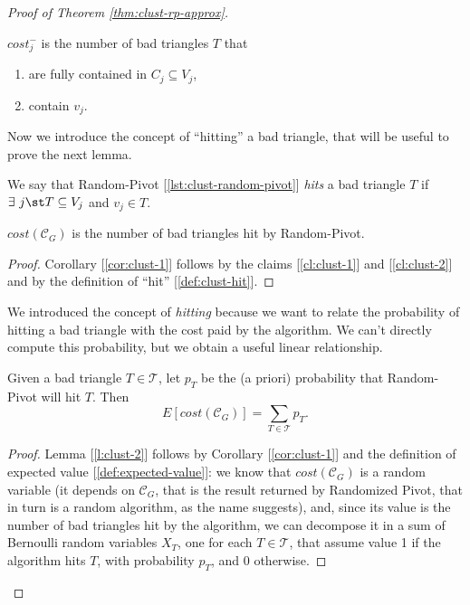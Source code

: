 \begin{proof}[Proof of Theorem \ref{thm:clust-rp-approx}]
    \begin{claim}\label{cl:clust-2}
        $cost_j^-$ is the number of bad triangles $T$ that
        \begin{enumerate}
            \item are fully contained in $C_j \subseteq V_j$,
            \item contain $v_j$.
        \end{enumerate}
    \end{claim}

    Now we introduce the concept of ``hitting'' a bad triangle, that will be useful to prove the next lemma.
    \begin{defn}[Hit]\label{def:clust-hit}
        We say that Random-Pivot [\ref{lst:clust-random-pivot}] \emph{hits} a bad triangle $T$ if $\exists\ j \st T \subseteq V_j$ and $v_j \in T$.
    \end{defn}

    \begin{cor}\label{cor:clust-1}
        $cost(\mathscr{C}_G)$ is the number of bad triangles hit by Random-Pivot.
    \end{cor}
    \begin{proof}
        Corollary [\ref{cor:clust-1}] follows by the claims [\ref{cl:clust-1}] and [\ref{cl:clust-2}] and by the definition of ``hit'' [\ref{def:clust-hit}].
    \end{proof}
    
    We introduced the concept of \textit{hitting} because we want to relate the probability of hitting a bad triangle with the cost paid by the algorithm. We can't directly compute this probability, but we obtain a useful linear relationship.
    \begin{lem}\label{l:clust-2}
        Given a bad triangle $T \in \mathscr{T}$, let $p_T$ be the (a priori) probability that Random-Pivot will hit $T$. Then
        \begin{equation}
            E[cost(\mathscr{C}_G)] = \sum_{T \in \mathscr{T}} p_T.
        \end{equation}
    \end{lem}
    \begin{proof}
        Lemma [\ref{l:clust-2}] follows by Corollary [\ref{cor:clust-1}] and the definition of expected value [\ref{def:expected-value}]: we know that $cost(\mathscr{C}_G)$ is a random variable (it depends on $\mathscr{C}_G$, that is the result returned by Randomized Pivot, that in turn is a random algorithm, as the name suggests), and, since its value is the number of bad triangles hit by the algorithm, we can decompose it in a sum of Bernoulli random variables $X_T$, one for each $T \in \mathscr{T}$, that assume value 1 if the algorithm hits $T$, with probability $p_T$, and 0 otherwise.
    \end{proof}


\end{proof}
